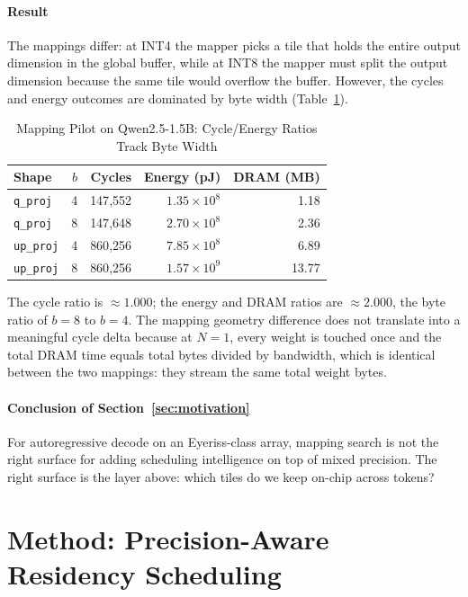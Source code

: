 \documentclass{ieeeaccess}
\begin{document}
\paragraph{Result} The mappings differ: at INT4 the mapper picks a tile
that holds the entire output dimension in the global buffer, while at
INT8 the mapper must split the output dimension because the same tile
would overflow the buffer. However, the cycles and energy outcomes are
dominated by byte width
(Table~\ref{tab:mapping_pilot}).

\begin{table}[t]
\caption{Mapping Pilot on Qwen2.5-1.5B: Cycle/Energy Ratios Track Byte Width}
\label{tab:mapping_pilot}
\centering
\begin{tabular}{lrrrr}
\toprule
Shape & $b$ & Cycles & Energy (pJ) & DRAM (MB) \\
\midrule
\texttt{q\_proj}  & 4 & 147{,}552 & $1.35\!\times\!10^8$ & 1.18 \\
\texttt{q\_proj}  & 8 & 147{,}648 & $2.70\!\times\!10^8$ & 2.36 \\
\texttt{up\_proj} & 4 & 860{,}256 & $7.85\!\times\!10^8$ & 6.89 \\
\texttt{up\_proj} & 8 & 860{,}256 & $1.57\!\times\!10^9$ & 13.77 \\
\bottomrule
\end{tabular}
\end{table}

The cycle ratio is $\approx 1.000$; the energy and DRAM ratios are
$\approx 2.000$, the byte ratio of $b=8$ to $b=4$. The mapping geometry
difference does not translate into a meaningful cycle delta because at
$N\!=\!1$, every weight is touched once and the total DRAM time equals
total bytes divided by bandwidth, which is identical between the two
mappings: they stream the same total weight bytes.

\paragraph{Conclusion of Section~\ref{sec:motivation}} For
autoregressive decode on an Eyeriss-class array, mapping search is not
the right surface for adding scheduling intelligence on top of mixed
precision. The right surface is the layer above: which tiles do we keep
on-chip across tokens?

\section{Method: Precision-Aware Residency Scheduling}
\label{sec:method}
\end{document}
